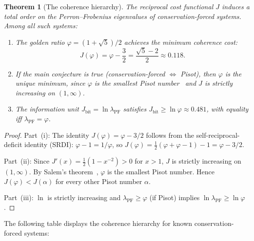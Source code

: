 \documentclass[12pt]{article}
\newtheorem{theorem}{Theorem}[section]
\theoremstyle{definition}
\theoremstyle{remark}
\DeclareMathOperator{\PF}{PF}
\begin{document}
\begin{theorem}[The coherence hierarchy]
\label{thm:hierarchy}
The reciprocal cost functional $J$ induces a total order on the Perron--Frobenius eigenvalues of conservation-forced systems. Among all such systems:
\begin{enumerate}
\item[(i)] The golden ratio $\varphi = (1 + \sqrt{5})/2$ achieves the minimum coherence cost:
\[
J(\varphi) = \varphi - \frac{3}{2} = \frac{\sqrt{5} - 2}{2} \approx 0.118.
\]
\item[(ii)] If the main conjecture is true (conservation-forced $\Leftrightarrow$ Pisot), then $\varphi$ is the \emph{unique} minimum, since $\varphi$ is the smallest Pisot number~\cite{Salem1963} and $J$ is strictly increasing on $(1, \infty)$.
\item[(iii)] The information unit $J_{\mathrm{bit}} = \ln \lambda_\PF$ satisfies $J_{\mathrm{bit}} \geq \ln \varphi \approx 0.481$, with equality iff $\lambda_\PF = \varphi$.
\end{enumerate}
\end{theorem}

\begin{proof}
Part~(i): The identity $J(\varphi) = \varphi - 3/2$ follows from the self-reciprocal-deficit identity (SRDI): $\varphi - 1 = 1/\varphi$, so $J(\varphi) = \frac{1}{2}(\varphi + \varphi - 1) - 1 = \varphi - 3/2$.

Part~(ii): Since $J'(x) = \frac{1}{2}(1 - x^{-2}) > 0$ for $x > 1$, $J$ is strictly increasing on $(1, \infty)$. By Salem's theorem~\cite{Salem1963}, $\varphi$ is the smallest Pisot number. Hence $J(\varphi) < J(\alpha)$ for every other Pisot number $\alpha$.

Part~(iii): $\ln$ is strictly increasing and $\lambda_\PF \geq \varphi$ (if Pisot) implies $\ln \lambda_\PF \geq \ln \varphi$.
\end{proof}

The following table displays the coherence hierarchy for known conservation-forced systems:
\end{document}
